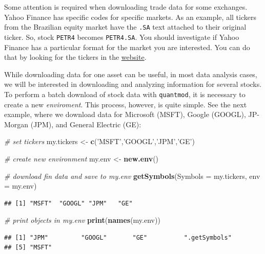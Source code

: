 \documentclass[11pt,]{book}
\newenvironment{Shaded}{\begin{snugshade}}{\end{snugshade}}
\newcommand{\KeywordTok}[1]{\textcolor[rgb]{0.27,0.27,0.27}{\textbf{#1}}}
\newcommand{\DataTypeTok}[1]{\textcolor[rgb]{0.27,0.27,0.27}{#1}}
\newcommand{\StringTok}[1]{\textcolor[rgb]{0.5,0.5,0.5}{#1}}
\newcommand{\CommentTok}[1]{\textcolor[rgb]{0.56,0.35,0.01}{\textit{#1}}}
\newcommand{\NormalTok}[1]{#1}
\begin{document}
Some attention is required when downloading trade data for some
exchanges. Yahoo Finance has specific codes for specific markets. As an
example, all tickers from the Brazilian equity market have the
\texttt{.SA} text attached to their original ticker. So, stock
\texttt{PETR4} becomes \texttt{PETR4.SA}. You should investigate if
Yahoo Finance has a particular format for the market you are interested.
You can do that by looking for the tickers in the
\href{https://finance.yahoo.com/}{website}.

While downloading data for one asset can be useful, in most data
analysis cases, we will be interested in downloading and analyzing
information for several stocks. To perform a batch download of stock
data with \texttt{quantmod}, it is necessary to create a new
\emph{enviroment}. This process, however, is quite simple. See the next
example, where we download data for Microsoft (MSFT), Google (GOOGL),
JP-Morgan (JPM), and General Electric (GE): 

\begin{Shaded}
\begin{Highlighting}[]
\CommentTok{# set tickers}
\NormalTok{my.tickers <-}\StringTok{ }\KeywordTok{c}\NormalTok{(}\StringTok{'MSFT'}\NormalTok{,}\StringTok{'GOOGL'}\NormalTok{,}\StringTok{'JPM'}\NormalTok{,}\StringTok{'GE'}\NormalTok{)}

\CommentTok{# create new environment}
\NormalTok{my.env <-}\StringTok{ }\KeywordTok{new.env}\NormalTok{()}

\CommentTok{# download fin data and save to my.env}
\KeywordTok{getSymbols}\NormalTok{(}\DataTypeTok{Symbols =}\NormalTok{ my.tickers, }\DataTypeTok{env =}\NormalTok{ my.env)}
\end{Highlighting}
\end{Shaded}

\begin{verbatim}
## [1] "MSFT"  "GOOGL" "JPM"   "GE"
\end{verbatim}

\begin{Shaded}
\begin{Highlighting}[]
\CommentTok{# print objects in my.env}
\KeywordTok{print}\NormalTok{(}\KeywordTok{names}\NormalTok{(my.env))}
\end{Highlighting}
\end{Shaded}

\begin{verbatim}
## [1] "JPM"         "GOOGL"       "GE"          ".getSymbols"
## [5] "MSFT"
\end{verbatim}
\end{document}
